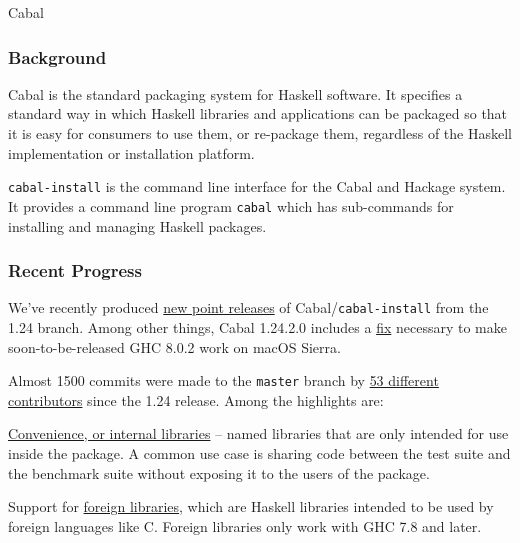 \begin{hcarentry}{Cabal}
\label{cabal}%
\makeheader

\subsubsection*{Background}

Cabal is the standard packaging system for Haskell software. It specifies a
standard way in which Haskell libraries and applications can be packaged so
that it is easy for consumers to use them, or re-package them, regardless of
the Haskell implementation or installation platform.

\texttt{cabal-install} is the command line interface for the Cabal and Hackage
system. It provides a command line program \texttt{cabal} which has
sub-commands for installing and managing Haskell packages.

\subsubsection*{Recent Progress}

We've recently produced
\href{https://mail.haskell.org/pipermail/cabal-devel/2016-December/010384.html}{new
  point releases} of Cabal/\texttt{cabal-install} from the 1.24
branch. Among other things, Cabal 1.24.2.0 includes a
\href{https://gitlab.haskell.org/ghc/ghc/-/issues/12479}{fix} necessary to
make soon-to-be-released GHC 8.0.2 work on macOS Sierra.

Almost 1500 commits were made to the \texttt{master} branch by
\href{https://gist.github.com/23Skidoo/1a291fd56a18b51f415db5fbaff56ec6}{53
different contributors} since the 1.24 release. Among the highlights are:

\begin{compactitem}
\item
  \href{http://cabal.readthedocs.io/en/latest/developing-packages.html#library}{Convenience,
    or internal libraries} -- named libraries that are only intended
  for use inside the package. A common use case is sharing code
  between the test suite and the benchmark suite without exposing it
  to the users of the package.

\item Support for
  \href{http://cabal.readthedocs.io/en/latest/developing-packages.html#foreign-libraries}{foreign
    libraries}, which are Haskell libraries intended to be used by
  foreign languages like C.  Foreign libraries only work with GHC 7.8
  and later.


\end{compactitem}
\end{hcarentry}
